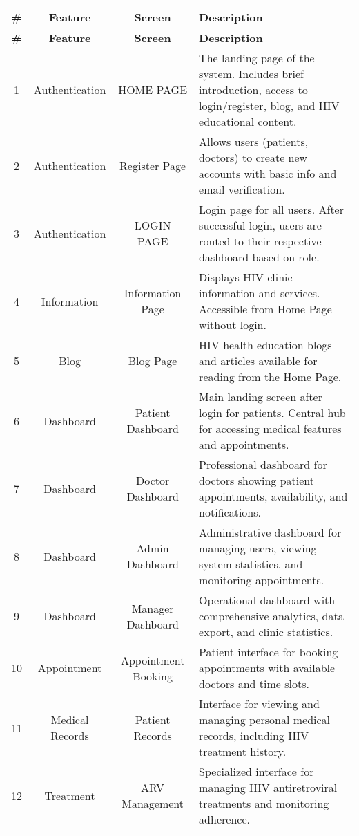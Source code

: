 \documentclass[12pt,a4paper]{article}
\begin{document}
\renewcommand{\arraystretch}{1.4}
\begin{longtable}{|c|c|c|p{8.5cm}|}
\hline
\textbf{\#} & \textbf{Feature} & \textbf{Screen} & \textbf{Description} \\
\hline
\endfirsthead

\hline
\textbf{\#} & \textbf{Feature} & \textbf{Screen} & \textbf{Description} \\
\hline
\endhead

1 & Authentication & HOME PAGE & The landing page of the system. Includes brief introduction, access to login/register, blog, and HIV educational content. \\
\hline
2 & Authentication & Register Page & Allows users (patients, doctors) to create new accounts with basic info and email verification. \\
\hline
3 & Authentication & LOGIN PAGE & Login page for all users. After successful login, users are routed to their respective dashboard based on role. \\
\hline
4 & Information & Information Page & Displays HIV clinic information and services. Accessible from Home Page without login. \\
\hline
5 & Blog & Blog Page & HIV health education blogs and articles available for reading from the Home Page. \\
\hline
6 & Dashboard & Patient Dashboard & Main landing screen after login for patients. Central hub for accessing medical features and appointments. \\
\hline
7 & Dashboard & Doctor Dashboard & Professional dashboard for doctors showing patient appointments, availability, and notifications. \\
\hline
8 & Dashboard & Admin Dashboard & Administrative dashboard for managing users, viewing system statistics, and monitoring appointments. \\
\hline
9 & Dashboard & Manager Dashboard & Operational dashboard with comprehensive analytics, data export, and clinic statistics. \\
\hline
10 & Appointment & Appointment Booking & Patient interface for booking appointments with available doctors and time slots. \\
\hline
11 & Medical Records & Patient Records & Interface for viewing and managing personal medical records, including HIV treatment history. \\
\hline
12 & Treatment & ARV Management & Specialized interface for managing HIV antiretroviral treatments and monitoring adherence. \\
\hline
\end{longtable}
\end{document}
